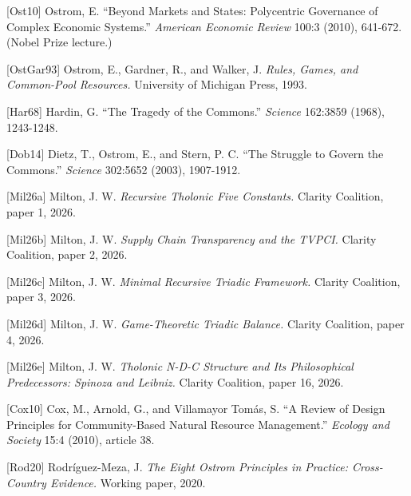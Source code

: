 \documentclass[
  11pt,
  letterpaper,
]{article}
\begin{document}
{[}Ost10{]} Ostrom, E. ``Beyond Markets and States: Polycentric
Governance of Complex Economic Systems.'' \emph{American Economic
Review} 100:3 (2010), 641-672. (Nobel Prize lecture.)

{[}OstGar93{]} Ostrom, E., Gardner, R., and Walker, J. \emph{Rules,
Games, and Common-Pool Resources.} University of Michigan Press, 1993.

{[}Har68{]} Hardin, G. ``The Tragedy of the Commons.'' \emph{Science}
162:3859 (1968), 1243-1248.

{[}Dob14{]} Dietz, T., Ostrom, E., and Stern, P. C. ``The Struggle to
Govern the Commons.'' \emph{Science} 302:5652 (2003), 1907-1912.

{[}Mil26a{]} Milton, J. W. \emph{Recursive Tholonic Five Constants.}
Clarity Coalition, paper 1, 2026.

{[}Mil26b{]} Milton, J. W. \emph{Supply Chain Transparency and the
TVPCI.} Clarity Coalition, paper 2, 2026.

{[}Mil26c{]} Milton, J. W. \emph{Minimal Recursive Triadic Framework.}
Clarity Coalition, paper 3, 2026.

{[}Mil26d{]} Milton, J. W. \emph{Game-Theoretic Triadic Balance.}
Clarity Coalition, paper 4, 2026.

{[}Mil26e{]} Milton, J. W. \emph{Tholonic N-D-C Structure and Its
Philosophical Predecessors: Spinoza and Leibniz.} Clarity Coalition,
paper 16, 2026.

{[}Cox10{]} Cox, M., Arnold, G., and Villamayor Tomás, S. ``A Review of
Design Principles for Community-Based Natural Resource Management.''
\emph{Ecology and Society} 15:4 (2010), article 38.

{[}Rod20{]} Rodríguez-Meza, J. \emph{The Eight Ostrom Principles in
Practice: Cross-Country Evidence.} Working paper, 2020.
\end{document}
